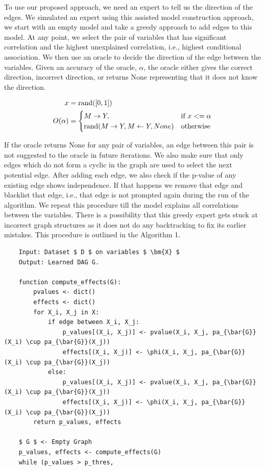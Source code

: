 \documentclass{uai2025} %
\begin{document}
To use our proposed approach, we need an expert to tell us the direction of the
edges. We simulated an expert using this assisted model construction approach,
we start with an empty model and take a greedy approach to add edges to this
model. At any point, we select the pair of variables that has significant
correlation and the highest unexplained correlation, i.e., highest conditional
association. We then use an oracle to decide the direction of the edge between
the variables. Given an accuracy of the oracle, $ \alpha $, the oracle either
gives the correct direction, incorrect direction, or returns None representing
that it does not know the direction.

\begin{equation}
	\begin{split}
		x &= \textnormal{rand}([0, 1]) \\
		O(\alpha) &= \begin{cases} 
			M \rightarrow Y, & \textnormal{if  } x <= \alpha \\
			\textnormal{rand}(M \rightarrow Y, M \leftarrow Y, None) & \textnormal{otherwise} \\
				\end{cases} \\
	\end{split}
\end{equation}

If the oracle returns None for any pair of variables, an edge between this pair
is not suggested to the oracle in future iterations. We also make sure that
only edges which do not form a cyclic in the graph are used to select the next
potential edge. After adding each edge, we also check if the p-value of any
existing edge shows independence. If that happens we remove that edge and
blacklist that edge, i.e., that edge is not prompted again during the run of
the algorithm. We repeat this procedure till the model explains all
correlations between the variables. There is a possibility that this greedy
expert gets stuck at incorrect graph structures as it does not do any
backtracking to fix its earlier mistakes. This procedure is outlined in the
Algorithm 1.

\begin{verbatim}
	Input: Dataset $ D $ on variables $ \bm{X} $
	Output: Learned DAG G.
	
	function compute_effects(G):
		pvalues <- dict()
		effects <- dict()
		for X_i, X_j in X:
			if edge between X_i, X_j:
				p_values[(X_i, X_j)] <- pvalue(X_i, X_j, pa_{\bar{G}}(X_i) \cup pa_{\bar{G}}(X_j))
				effects[(X_i, X_j)] <- \phi(X_i, X_j, pa_{\bar{G}}(X_i) \cup pa_{\bar{G}}(X_j))
			else:
				p_values[(X_i, X_j)] <- pvalue(X_i, X_j, pa_{\bar{G}}(X_i) \cup pa_{\bar{G}}(X_j))
				effects[(X_i, X_j)] <- \phi(X_i, X_j, pa_{\bar{G}}(X_i) \cup pa_{\bar{G}}(X_j))
		return p_values, effects
	
	$ G $ <- Empty Graph
	p_values, effects <- compute_effects(G)
	while (p_values > p_thres, 
\end{verbatim}
\end{document}
